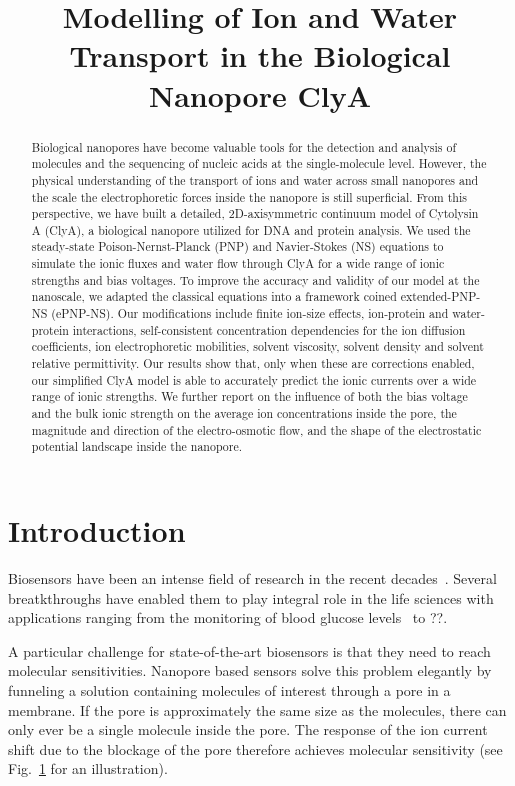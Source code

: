 \documentclass[journal=ancac3, manuscript=article, etalmode=truncate,maxauthors=0]{achemso}
\title{Modelling of Ion and Water Transport in the Biological Nanopore ClyA}
\begin{document}
\maketitle
\newpage
\begin{abstract}
Biological nanopores have become valuable tools for the detection and analysis of molecules and the 
sequencing of nucleic acids at the single-molecule level. However, the physical understanding of the 
transport of ions and water across small nanopores and the scale the electrophoretic forces inside the 
nanopore is still superficial. From this perspective, we have built a detailed, 2D-axisymmetric continuum 
model of Cytolysin A (ClyA), a biological nanopore utilized for DNA and protein analysis. We used the 
steady-state Poison-Nernst-Planck (PNP) and Navier-Stokes (NS) equations to simulate the ionic fluxes and 
water flow through ClyA for a wide range of ionic strengths and bias voltages. To improve the accuracy and 
validity of our model at the nanoscale, we adapted the classical equations into a framework coined 
extended-PNP-NS (ePNP-NS). Our modifications include finite ion-size effects, ion-protein and water-protein 
interactions, self-consistent concentration dependencies for the ion diffusion coefficients, ion 
electrophoretic mobilities, solvent viscosity, solvent density and solvent relative permittivity. Our results 
show that, only when these are corrections enabled, our simplified ClyA model is able to accurately predict 
the ionic currents over a wide range of ionic strengths. We further report on the influence of both the bias 
voltage and the bulk ionic strength on the average ion concentrations inside the pore, the magnitude and 
direction of the electro-osmotic flow, and the shape of the electrostatic potential landscape inside the 
nanopore.
\end{abstract}
\newpage
\section{Introduction}
Biosensors have been an intense field of research in the recent decades~\cite{zhan2015}. 
Several breatkthroughs have enabled them to play integral role in the life sciences with
applications ranging from the monitoring of blood glucose levels~\cite{chen2013} to ??. 

A particular challenge for state-of-the-art biosensors is that they need to reach molecular
sensitivities.  Nanopore based sensors solve this problem elegantly by funneling a solution
containing molecules of interest through a pore in a membrane. If the pore is approximately the
same size as the molecules, there can only ever be a single molecule inside the pore. The response
of the ion current shift due to the blockage of the pore therefore achieves molecular sensitivity
(see Fig.~\ref{} for an illustration).
\end{document}
